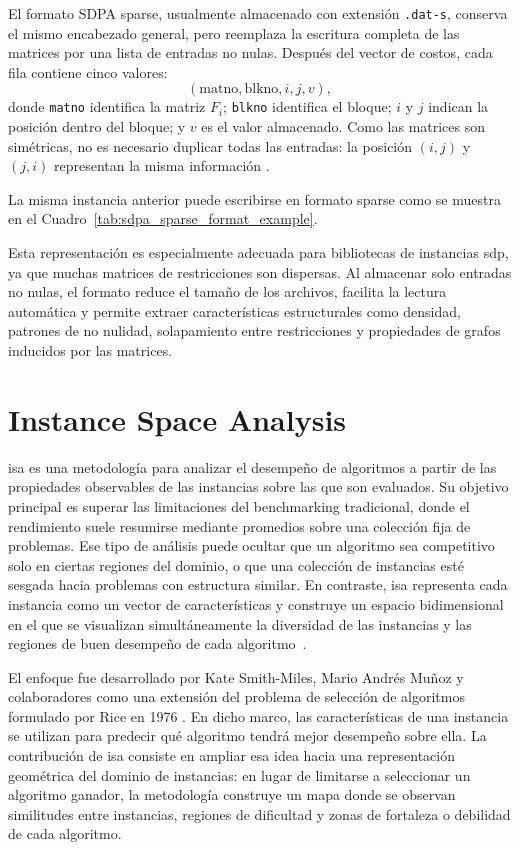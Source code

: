 El formato SDPA sparse, usualmente almacenado con extensión \texttt{.dat-s}, conserva el mismo
encabezado general, pero reemplaza la escritura completa de las matrices por una lista de
entradas no nulas. Después del vector de costos, cada fila contiene cinco valores:
\[
    (\text{matno},\text{blkno},i,j,v),
\]
donde \texttt{matno} identifica la matriz $F_i$; \texttt{blkno} identifica el bloque; $i$ y $j$
indican la posición dentro del bloque; y $v$ es el valor almacenado. Como las matrices son
simétricas, no es necesario duplicar todas las entradas: la posición $(i,j)$ y $(j,i)$ representan
la misma información \cite{SDPAFormat}.

La misma instancia anterior puede escribirse en formato sparse como se muestra en el
Cuadro~\ref{tab:sdpa_sparse_format_example}.



Esta representación es especialmente adecuada para bibliotecas de instancias \acrshort{sdp}, ya
que muchas matrices de restricciones son dispersas. Al almacenar solo entradas no nulas, el
formato reduce el tamaño de los archivos, facilita la lectura automática y permite extraer
características estructurales como densidad, patrones de no nulidad, solapamiento entre
restricciones y propiedades de grafos inducidos por las matrices.

\newpage
\section{Instance Space Analysis}
\label{sec:instance_space_analysis}

\acrfull{isa} es una metodología para analizar el desempeño de algoritmos a partir de las
propiedades observables de las instancias sobre las que son evaluados. Su objetivo principal es
superar las limitaciones del benchmarking tradicional, donde el rendimiento suele resumirse
mediante promedios sobre una colección fija de problemas. Ese tipo de análisis puede ocultar
que un algoritmo sea competitivo solo en ciertas regiones del dominio, o que una colección de
instancias esté sesgada hacia problemas con estructura similar. En contraste, \acrshort{isa}
representa cada instancia como un vector de características y construye un espacio bidimensional
en el que se visualizan simultáneamente la diversidad de las instancias y las regiones de buen
desempeño de cada algoritmo~\cite{smith-milesInstanceSpaceAnalysis2023}.

El enfoque fue desarrollado por Kate Smith-Miles, Mario Andrés Muñoz y colaboradores como
una extensión del problema de selección de algoritmos formulado por Rice en 1976
\cite{riceAlgorithmSelectionProblem1976}. En dicho marco, las características de una instancia
se utilizan para predecir qué algoritmo tendrá mejor desempeño sobre ella. La contribución de
\acrshort{isa} consiste en ampliar esa idea hacia una representación geométrica del dominio de
instancias: en lugar de limitarse a seleccionar un algoritmo ganador, la metodología construye un
mapa donde se observan similitudes entre instancias, regiones de dificultad y zonas de fortaleza o
debilidad de cada algoritmo.

